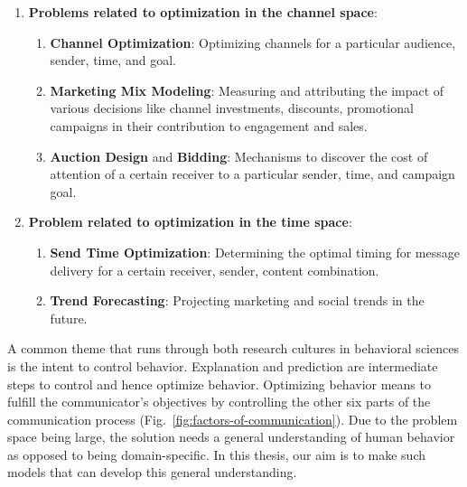 \begin{enumerate}
\item \textbf{Problems related to optimization in the channel space}:
    \begin{enumerate}
        \item \textbf{Channel Optimization}: Optimizing channels for a particular audience, sender, time, and goal.
        \item \textbf{Marketing Mix Modeling}: Measuring and attributing the impact of various decisions like channel investments, discounts, promotional campaigns in their contribution to engagement and sales. 
        \item \textbf{Auction Design} and \textbf{Bidding}: Mechanisms to discover the cost of attention of a certain receiver to a particular sender, time, and campaign goal.
    \end{enumerate}
    
\item \textbf{Problem related to optimization in the time space}:
    \begin{enumerate}
        \item \textbf{Send Time Optimization}: Determining the optimal timing for message delivery for a certain receiver, sender, content combination.

        \item \textbf{Trend Forecasting}: Projecting marketing and social trends in the future.
    \end{enumerate}
        
\end{enumerate}







A common theme that runs through both research cultures in behavioral sciences is the intent to control behavior. Explanation and prediction are intermediate steps to control and hence optimize behavior. Optimizing behavior means to fulfill the communicator's objectives by controlling the other six parts of the communication process (Fig.~\ref{fig:factors-of-communication}). Due to the problem space being large, the solution needs a general understanding of human behavior as opposed to being domain-specific. In this thesis, our aim is to make such models that can develop this general understanding.


